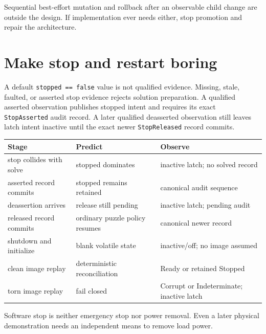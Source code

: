 \documentclass[10pt]{article}
\begin{document}
Sequential best-effort mutation and rollback after an observable child change
are outside the design. If implementation ever needs either, stop promotion
and repair the architecture.

\section{Make stop and restart boring}
A default \texttt{stopped == false} value is not qualified evidence. Missing,
stale, faulted, or asserted stop evidence rejects solution preparation.
A qualified asserted observation publishes stopped intent and requires its
exact \texttt{StopAsserted} audit record. A later qualified deasserted
observation still leaves latch intent inactive until the exact newer
\texttt{StopReleased} record commits.

\begin{tabularx}{\linewidth}{@{}l X X@{}}
\toprule
Stage & Predict & Observe\\
\midrule
stop collides with solve & stopped dominates & inactive latch; no solved record\\
asserted record commits & stopped remains retained & canonical audit sequence\\
deassertion arrives & release still pending & inactive latch; pending audit\\
released record commits & ordinary puzzle policy resumes & canonical newer record\\
shutdown and initialize & blank volatile state & inactive/off; no image assumed\\
clean image replay & deterministic reconciliation & Ready or retained Stopped\\
torn image replay & fail closed & Corrupt or Indeterminate; inactive latch\\
\bottomrule
\end{tabularx}

Software stop is neither emergency stop nor power removal. Even a later
physical demonstration needs an independent means to remove load power.
\end{document}
